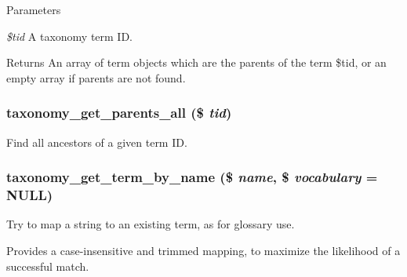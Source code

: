 \begin{DoxyParams}{Parameters}
\item[{\em \$tid}]A taxonomy term ID.\end{DoxyParams}
\begin{DoxyReturn}{Returns}
An array of term objects which are the parents of the term \$tid, or an empty array if parents are not found. 
\end{DoxyReturn}
\hypertarget{taxonomy_8module_a049135d37e3c978e47997d35e8ab71bb}{
\subsubsection[{taxonomy\_\-get\_\-parents\_\-all}]{\setlength{\rightskip}{0pt plus 5cm}taxonomy\_\-get\_\-parents\_\-all (\$ {\em tid})}}
\label{taxonomy_8module_a049135d37e3c978e47997d35e8ab71bb}
Find all ancestors of a given term ID. \hypertarget{taxonomy_8module_aeba50f03c60d5bd29fff7579b2917081}{
\subsubsection[{taxonomy\_\-get\_\-term\_\-by\_\-name}]{\setlength{\rightskip}{0pt plus 5cm}taxonomy\_\-get\_\-term\_\-by\_\-name (\$ {\em name}, \/  \$ {\em vocabulary} = {\ttfamily NULL})}}
\label{taxonomy_8module_aeba50f03c60d5bd29fff7579b2917081}
Try to map a string to an existing term, as for glossary use.

Provides a case-\/insensitive and trimmed mapping, to maximize the likelihood of a successful match.


